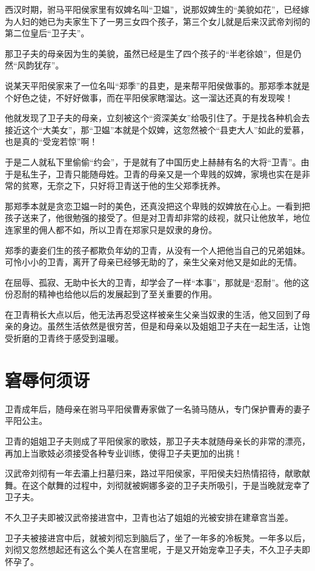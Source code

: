 \documentclass[UTF8,cap,nofonts,openany,twoside]{ctexbook}
\begin{document}
西汉时期，驸马平阳侯家里有奴婢名叫“卫媪”，说那奴婢生的“美貌如花”，已经嫁为人妇的她已为夫家生下了一男三女四个孩子，第三个女儿就是后来汉武帝刘彻的第二位皇后“卫子夫”。

那卫子夫的母亲因为生的美貌，虽然已经是生了四个孩子的“半老徐娘”，但是仍然“风韵犹存”。

说某天平阳侯家来了一位名叫“郑季”的县吏，是来帮平阳侯做事的。那郑季本就是个好色之徒，不好好做事，而在平阳侯家瞎溜达。这一溜达还真的有发现唉！

他就发现了卫子夫的母亲，立刻被这个“资深美女”给吸引住了。于是找各种机会去接近这个“大美女”，那“卫媪”本就是个奴婢，这忽然被个“县吏大人”如此的爱慕，也是真的“受宠若惊”啊！

于是二人就私下里偷偷“约会”，于是就有了中国历史上赫赫有名的大将“卫青”。由于是私生子，卫青只能随母姓。卫青的母亲又是一个卑贱的奴婢，家境也实在是非常的贫寒，无奈之下，只好将卫青送于他的生父郑季抚养。

那郑季本就是贪恋卫媪一时的美色，还真没把这个卑贱的奴婢放在心上。一看到把孩子送来了，他很勉强的接受了。但是对卫青却非常的歧视，就只让他放羊，地位连家里的佣人都不如，所以卫青在郑家只是奴隶的身份。

郑季的妻妾们生的孩子都欺负年幼的卫青，从没有一个人把他当自己的兄弟姐妹。可怜小小的卫青，离开了母亲已经够无助的了，亲生父亲对他又是如此的无情。

在屈辱、孤寂、无助中长大的卫青，却学会了一样“本事”，那就是“忍耐”。他的这份忍耐的精神也给他以后的发展起到了至关重要的作用。

在卫青稍长大点以后，他无法再忍受这样被亲生父亲当奴隶的生活，他又回到了母亲的身边。虽然生活依然是很穷苦，但是和母亲以及姐姐卫子夫在一起生活，让饱受折磨的卫青终于感受到温暖。

\chapter{窘辱何须讶}

卫青成年后，随母亲在驸马平阳侯曹寿家做了一名骑马随从，专门保护曹寿的妻子平阳公主。

卫青的姐姐卫子夫则成了平阳侯家的歌妓，那卫子夫本就随母亲长的非常的漂亮，再加上当歌妓必须接受各种专业训练，使得卫子夫更加的出挑！

汉武帝刘彻有一年去灞上扫墓归来，路过平阳侯家，平阳侯夫妇热情招待，献歌献舞。在这个献舞的过程中，刘彻就被婀娜多姿的卫子夫所吸引，于是当晚就宠幸了卫子夫。

不久卫子夫即被汉武帝接进宫中，卫青也沾了姐姐的光被安排在建章宫当差。

卫子夫被接进宫中后，就被刘彻忘到脑后了，坐了一年多的冷板凳。一年多以后，刘彻又忽然想起还有这么个美人在宫里呢，于是又开始宠幸卫子夫，不久卫子夫即怀孕了。
\end{document}

